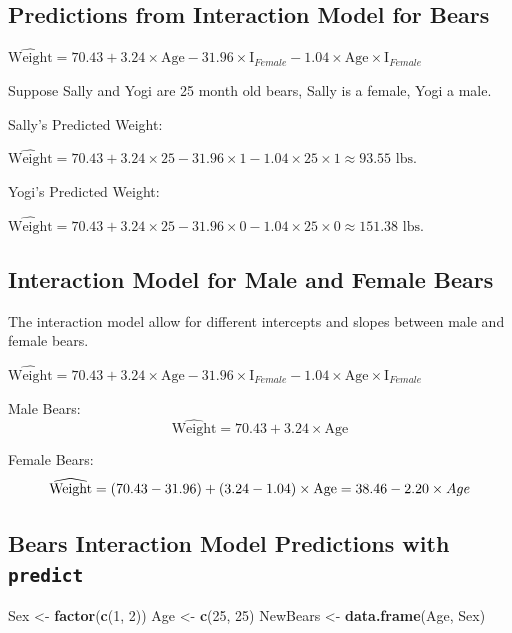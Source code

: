 \documentclass[]{book}
\newenvironment{Shaded}{\begin{snugshade}}{\end{snugshade}}
\newcommand{\KeywordTok}[1]{\textcolor[rgb]{0.13,0.29,0.53}{\textbf{#1}}}
\newcommand{\DecValTok}[1]{\textcolor[rgb]{0.00,0.00,0.81}{#1}}
\newcommand{\StringTok}[1]{\textcolor[rgb]{0.31,0.60,0.02}{#1}}
\newcommand{\NormalTok}[1]{#1}
\begin{document}
\subsection{Predictions from Interaction Model for
Bears}\label{predictions-from-interaction-model-for-bears}

\(\widehat{\text{Weight}}= 70.43 + 3.24 \times\text{Age}- 31.96\times\text{I}_{Female} -1.04\times\text{Age}\times\text{I}_{Female}\)

Suppose Sally and Yogi are 25 month old bears, Sally is a female, Yogi a
male.

Sally's Predicted Weight:

\(\widehat{\text{Weight}}= 70.43+ 3.24 \times 25- 31.96\times1 -1.04\times25\times1 \approx 93.55 \text{ lbs.}\)

Yogi's Predicted Weight:

\(\widehat{\text{Weight}}= 70.43+ 3.24 \times 25- 31.96\times0 -1.04\times25\times0 \approx 151.38 \text{ lbs.}\)

\subsection{Interaction Model for Male and Female
Bears}\label{interaction-model-for-male-and-female-bears}

The interaction model allow for different intercepts and slopes between
male and female bears.

\(\widehat{\text{Weight}}= 70.43 + 3.24 \times\text{Age}- 31.96\times\text{I}_{Female} -1.04\times\text{Age}\times\text{I}_{Female}\)

Male Bears: \[
\widehat{\text{Weight}}= 70.43 + 3.24 \times\text{Age}
\]

Female Bears: \[
\widehat{\text{Weight}}= (70.43 -31.96) + (3.24 -1.04)\times\text{Age} \\
= 38.46-2.20\times Age
\]

\subsection{\texorpdfstring{Bears Interaction Model Predictions with
\texttt{predict}}{Bears Interaction Model Predictions with predict}}\label{bears-interaction-model-predictions-with-predict}

\begin{Shaded}
\begin{Highlighting}[]
\NormalTok{Sex <-}\StringTok{ }\KeywordTok{factor}\NormalTok{(}\KeywordTok{c}\NormalTok{(}\DecValTok{1}\NormalTok{, }\DecValTok{2}\NormalTok{))}
\NormalTok{Age <-}\StringTok{ }\KeywordTok{c}\NormalTok{(}\DecValTok{25}\NormalTok{, }\DecValTok{25}\NormalTok{)}
\NormalTok{NewBears <-}\StringTok{ }\KeywordTok{data.frame}\NormalTok{(Age, Sex)}
\end{Highlighting}
\end{Shaded}
\end{document}
